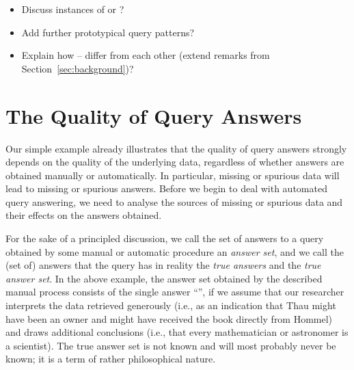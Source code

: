 %
\begin{itemize}
  \item
    Discuss instances of  or ?
  \item
    Add further prototypical query patterns?
  \item
    Explain how -- differ from each other (extend remarks from Section~\ref{sec:background})?
\end{itemize}

\section{The Quality of Query Answers}
\label{sec:quality_of_answers}

Our simple example already illustrates that the quality of query answers
strongly depends on the quality of the underlying data,
regardless of whether answers are obtained manually or automatically. 
In particular, missing or spurious data will lead to missing or spurious answers.
Before we begin to deal with automated query answering,
we need to analyse the sources of missing or spurious data and their effects on the answers obtained.

For the sake of a principled discussion, we call the set of answers to a query obtained by some manual or automatic procedure
an \emph{answer set}, and we call the (set of) answers that the query has in reality the \emph{true answers} and the \emph{true answer set}.
In the above example, the answer set obtained by the described manual process consists of the single answer
\enquote{}, if we assume that our researcher interprets the data retrieved generously
(i.e., as an indication that Thau might have been an owner and might have received the book directly from Hommel)
and draws additional conclusions (i.e., that every mathematician or astronomer is a scientist).
The true answer set is not known and will most probably never be known; it is a term of rather philosophical nature.

